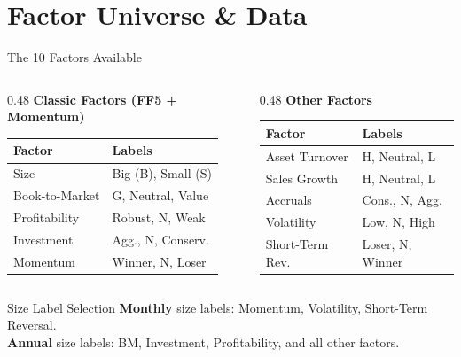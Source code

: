 \documentclass[aspectratio=169, 12pt]{beamer}
\begin{document}
\section{Factor Universe \& Data}

\begin{frame}{The 10 Factors Available}
  \begin{columns}[T]
    \begin{column}{0.48\textwidth}
      {\color{primary}\textbf{Classic Factors (FF5 + Momentum)}}
      \smallskip
      \begin{tabular}{ll}
        \toprule
        Factor & Labels \\
        \midrule
        Size & Big (B), Small (S) \\
        Book-to-Market & G, Neutral, Value \\
        Profitability & Robust, N, Weak \\
        Investment & Agg., N, Conserv. \\
        Momentum & Winner, N, Loser \\
        \bottomrule
      \end{tabular}
    \end{column}
    \begin{column}{0.48\textwidth}
      {\color{accent}\textbf{Other Factors}}
      \smallskip
      \begin{tabular}{ll}
        \toprule
        Factor & Labels \\
        \midrule
        Asset Turnover & H, Neutral, L \\
        Sales Growth & H, Neutral, L \\
        Accruals & Cons., N, Agg. \\
        Volatility & Low, N, High \\
        Short-Term Rev. & Loser, N, Winner \\
        \bottomrule
      \end{tabular}
    \end{column}
  \end{columns}
  \vspace{4pt}
  \begin{alertblock}{Size Label Selection}
    \textbf{Monthly} size labels: Momentum, Volatility, Short-Term Reversal.\\
    \textbf{Annual} size labels: BM, Investment, Profitability, and all other factors.
  \end{alertblock}
\end{frame}
\end{document}
